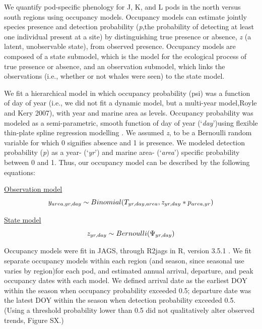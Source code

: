 \documentclass{article}
\begin{document}
\par We quantify pod-specific phenology for J, K, and L pods in the north versus south regions using occupancy models. Occupancy models can estimate jointly species presence and detection probability (\emph{p},the probability of detecting at least one individual present at a site) by distinguishing true presence or absence, \emph{z} (a latent, unobservable state), from observed presence. Occupancy models are composed of a state submodel, which is the model for the ecological process of true presence or absence, and  an observation submodel, which links the observations (i.e., whether or not whales were seen) to the state model.
\par We fit a hierarchical model in which occupancy probability (psi) was a function of day of year (i.e., we did not fit a dynamic model, but a multi-year model,Royle and Kery 2007), with year and marine area as levels. Occupancy probability was modeled as a semi-parametric, smooth function of day of year (`\emph{day}')using flexible thin-plate spline regression modelling \citep{strebel2014}. We assumed \emph{z}, to be a Bernoulli random variable for which 0 signifies absence and 1 is presence. We modeled detection probability (\emph{p}) as a year- (`\emph{yr}') and marine area- (`\emph{area}') specific probability between 0 and 1. Thus, our occupancy model can be described by the following equations:

\par \underline{Observation model}
\begin{equation} 
y_{area,yr,day} \sim Binomial (T_{yr,day,area}, z_{yr,day} * p_{area,yr})\\
\end{equation}

\par \underline{State model}
\begin{equation} 
z_{yr,day} \sim Bernoulli (\mathrm{\Psi}_{yr,day})\\
\end{equation}

\par Occupancy models were fit in JAGS, through R2jags \citep{su2015} in R, version 3.5.1 \citep{r2018}. We fit separate occupancy models within each region (and season, since seasonal use varies by region)for each pod, and estimated annual arrival, departure, and peak occupancy dates with each model. We defined arrival date as the earliest DOY within the season when occupancy probability exceeded 0.5; departure date was the latest DOY within the season when detection probability exceeded 0.5. (Using a threshold probability lower than 0.5 did not qualitatively alter observed trends, Figure SX.)
\end{document}
